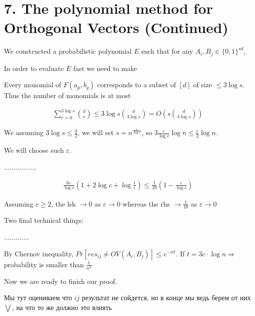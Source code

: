 \section{7. The polynomial method for Orthogonal Vectors (Continued)}

We constructed a probabilistic polynomial $E$ such that for any $A_i, B_j \in \{ 0, 1\}^{sd}$,

In order to evaluate $E$ fast we need to make

Every monomial of $F(a_p, b_q)$ corresponds to a subset of $[d]$ of size $\leq 3 \log s$.
Thus the number of monomials is at most 

\begin{align*}
	\sum_{r = 0}^{3 \log s} \binom{d}{r} \leq 3 \log s \binom{d} {3 \log s} = O\left(s \binom{d}{3 \log s}\right)
\end{align*}

We assuming $3 \log s \leq \frac{d}{2}$, we will set $s = n^{\frac{\varepsilon}{\log c}}$, so $3 \frac{\varepsilon}{\log c} \log n \leq \frac{c}{2} \log n$.

We will choose such $\varepsilon$.

{\color{red}.................}

\begin{align*}
	\frac{6\varepsilon}{\log c} (1 + 2 \log c + \log{\frac{1}{\varepsilon}}) \leq \frac{1}{10}(1 - \frac{\varepsilon}{\log c})
\end{align*}

Assuming $c \geq 2$, the lsh $\to 0$ as $\varepsilon \to 0$ whereas the rhs $\to \frac{1}{10}$ as $\varepsilon \to 0$ 

Two final technical things:

{\color{red} .............}

By Chernov inequality, $Pr[res_{i j} \neq OV(A_i, B_j)] \leq e^{-\alpha t}$.
If $t = 3c \cdot \log n \Rightarrow$ probability is smaller than $\frac{1}{n^3}$ 

Now we are ready to finish our proof.

{\color{blue} Мы тут оцениваем что $i j$ результат не сойдется, но в конце мы ведь берем от них $\bigvee$, на что то же должно это влиять}
